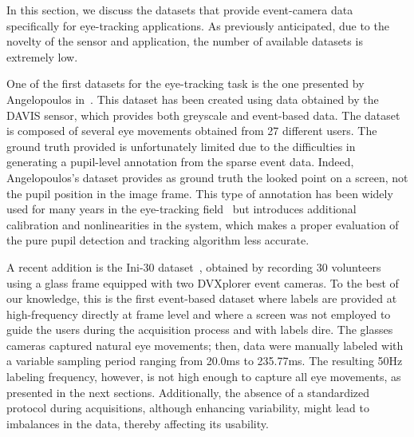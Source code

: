 \label{sec::soa}
In this section, we discuss the datasets that provide event-camera data specifically for eye-tracking applications. As previously anticipated, due to the novelty of the sensor and application, the number of available datasets is extremely low.

One of the first datasets for the eye-tracking task is the one presented by Angelopoulos in~\cite{angelopoulos2020event}. This dataset has been created using data obtained by the DAVIS sensor, which provides both greyscale and event-based data. The dataset is composed of several eye movements obtained from 27 different users. 
The ground truth provided is unfortunately limited due to the difficulties in generating a pupil-level annotation from the sparse event data. Indeed, Angelopoulos's dataset provides as ground truth the looked point on a screen, not the pupil position in the image frame. This type of annotation has been widely used for many years in the eye-tracking field~\cite{holmqvist_eye_movements} but introduces additional calibration and nonlinearities in the system, which makes a proper evaluation of the pure pupil detection and tracking algorithm less accurate.

A recent addition is the Ini-30 dataset~\cite{bonazzi2024retina}, obtained by recording 30 volunteers using a glass frame equipped with two DVXplorer event cameras. To the best of our knowledge, this is the first event-based dataset where labels are provided at high-frequency directly at frame level and where a screen was not employed to guide the users during the acquisition process and with labels dire. The glasses cameras captured natural eye movements; then, data were manually labeled with a variable sampling period ranging from 20.0ms to 235.77ms. The resulting 50Hz labeling frequency, however, is not high enough to capture all eye movements, as presented in the next sections. Additionally, the absence of a standardized protocol during acquisitions, although enhancing variability, might lead to imbalances in the data, thereby affecting its usability.


